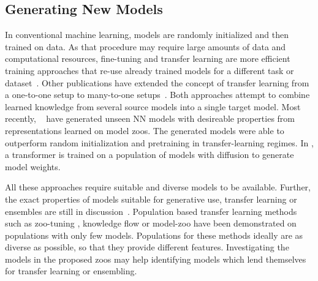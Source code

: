 \subsection{Generating New Models}
In conventional machine learning, models are randomly initialized and then trained on data. 
As that procedure may require large amounts of data and computational resources, fine-tuning and transfer learning are more efficient training approaches that re-use already trained models for a different task or dataset~\citep{yosinskiHowTransferableAre2014,fengTransferredDiscrepancyQuantifying2020}.
%
Other publications have extended the concept of transfer learning from a one-to-one setup to many-to-one setups~\citep{liuKnowledgeFlowImprove2019,shuZooTuningAdaptiveTransfer2021}. 
Both approaches attempt to combine learned knowledge from several source models into a single target model. 
Most recently, ~\citep{schurholtHyperRepresentationsGenerativeModels2022,schurholtHyperRepresentationsPreTrainingTransfer2022} have generated unseen NN models with desireable properties from representations learned on model zoos. The generated models were able to outperform random initialization and pretraining in transfer-learning regimes. In \citep{peeblesLearningLearnGenerative2022}, a transformer is trained on a population of models with diffusion to generate model weights.

All these approaches require suitable and diverse models to be available. Further, the exact properties of models suitable for generative use, transfer learning or ensembles are still in discussion~\citep{fengTransferredDiscrepancyQuantifying2020}.
Population based transfer learning methods such as zoo-tuning \citep{shuZooTuningAdaptiveTransfer2021}, knowledge flow \citep{liuKnowledgeFlowImprove2019} or model-zoo \citep{rameshModelZooGrowing2022} have been demonstrated on populations with only few models. Populations for these methods ideally are as diverse as possible, so that they provide different features. 
Investigating the models in the proposed zoos may help identifying models which lend themselves for transfer learning or ensembling.


